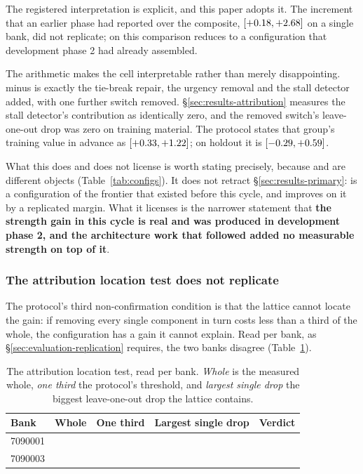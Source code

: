 The registered interpretation is explicit, and this paper adopts it. The increment that an earlier
phase had reported over the composite, \vsevenKthreeOverComposite{}
$[+0.18, +2.68]$ on a single bank, did not replicate;
on this comparison \sestina{} reduces to a configuration that development phase 2 had already
assembled.

The arithmetic makes the cell interpretable rather than merely disappointing. \sestina{} minus
\composite{} is exactly the tie-break repair, the urgency removal and the stall detector added, with
one further switch removed. \S\ref{sec:results-attribution} measures the stall detector's
contribution as identically zero, and the removed switch's leave-one-out drop was zero on training
material. The protocol states that group's training value in advance as \vsevenTrainGroup{}
$[+0.33, +1.22]$; on holdout it is \vsevenBtwoComposite{}
$[-0.29, +0.59]$.

What this does and does not license is worth stating precisely, because \fcheap{} and \composite{}
are different objects (Table~\ref{tab:configs}). It does not retract
\S\ref{sec:results-primary}: \fcheap{} is a configuration of the \vsix{} frontier that existed before
this cycle, and \sestina{} improves on it by a replicated margin. What it licenses is the narrower
statement that \textbf{the strength gain in this cycle is real and was produced in development phase
2, and the architecture work that followed added no measurable strength on top of it}.

\subsubsection{The attribution location test does not replicate}
\label{sec:results-location}

The protocol's third non-confirmation condition is that the lattice cannot locate the gain: if
removing every single component in turn costs less than a third of the whole, the configuration has a
gain it cannot explain. Read per bank, as \S\ref{sec:evaluation-replication} requires, the two banks
disagree (Table~\ref{tab:location}).

\begin{table}[!ht]\centering
\caption{The attribution location test, read per bank. \emph{Whole} is the measured whole,
\emph{one third} the protocol's threshold, and \emph{largest single drop} the biggest
leave-one-out drop the lattice contains.}
\label{tab:location}
{\tabfont
\begin{tabular}{lrrlc}
\toprule
Bank & Whole & One third & Largest single drop & Verdict \\
\midrule
7090001 & \vsevenLocWholeOne{} & \vsevenLocThirdOne{} & \texttt{\vsevenLocAtOne{}} \vsevenLocBiggestOne{} & \vsevenLocVerdictOne{} \\
7090003 & \vsevenLocWholeThree{} & \vsevenLocThirdThree{} & \texttt{\vsevenLocAtThree{}} \vsevenLocBiggestThree{} & \vsevenLocVerdictThree{} \\
\bottomrule
\end{tabular}}
\end{table}

